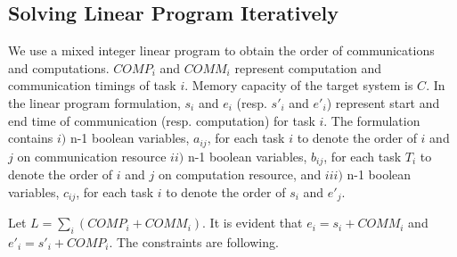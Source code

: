 \documentclass[sigconf]{acmart}
\begin{document}
	\subsection{Solving Linear Program Iteratively}
	\label{subsec:linearprogrammingformulation}
	We use a mixed integer linear program to obtain the order of communications and computations.  $COMP_i$ and $COMM_i$ represent computation and communication timings of task $i$. Memory capacity of the target system is $C$. In the linear program formulation, $s_i$ and $e_i$ (resp. $s'_i$ and $e'_i$) represent start and end time of communication (resp. computation) for task $i$. The formulation contains $i)$ n-1 boolean variables, $a_{ij}$, for each task $i$ to denote the order of $i$ and $j$ on communication resource $ii)$ n-1 boolean variables, $b_{ij}$, for each task $T_i$ to denote the order of $i$ and $j$ on computation resource, and $iii)$ n-1 boolean variables, $c_{ij}$, for each task $i$ to denote the order of $s_i$ and $e'_j$.
	
	
	
	
	
	
	\noindent Let $L=\sum_i (COMP_i + COMM_i)$. It is evident that $e_i =s_i + COMM_i$ and $e'_i =s'_i + COMP_i$. The constraints are following.
	
\end{document}
